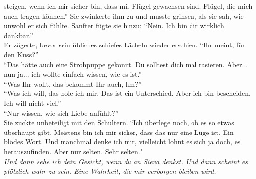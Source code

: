 steigen, wenn ich mir sicher bin, dass mir Flügel gewachsen sind. Flügel, die mich auch tragen 
können.'' Sie zwinkerte ihm zu und musste grinsen, als sie sah, wie unwohl er sich 
fühlte. Sanfter fügte sie hinzu: ``Nein. Ich bin dir wirklich dankbar.''\\
Er zögerte, bevor sein übliches schiefes Lächeln wieder erschien. ``Ihr meint, für den Kuss?''\\
``Das hätte auch eine Strohpuppe gekonnt. Du solltest dich mal rasieren. Aber... nun ja... ich 
wollte einfach wissen, wie es ist.''\\
``Was Ihr wollt, das bekommt Ihr auch, hm?''\\
``Was ich will, das hole ich mir. Das ist ein Unterschied. Aber ich bin bescheiden. Ich will nicht 
viel.''\\
``Nur wissen, wie sich Liebe anfühlt?''\\
Sie zuckte unbeteiligt mit den Schultern. ``Ich überlege noch, ob es so etwas überhaupt gibt. 
Meistens bin ich mir sicher, dass das nur eine Lüge ist. Ein blödes Wort. Und manchmal denke ich 
mir, vielleicht lohnt es sich ja doch, es herauszufinden. Aber nur selten. Sehr selten."\\
\textit{Und dann sehe ich dein Gesicht, wenn du an Sieva denkst. Und dann scheint es plötzlich wahr 
zu sein. Eine Wahrheit, die mir verborgen bleiben wird.}
